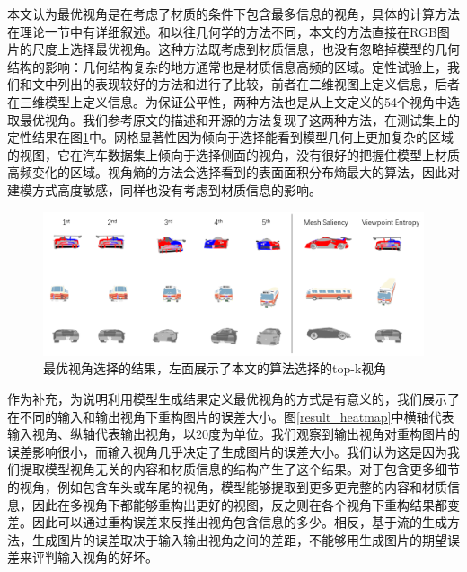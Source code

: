 \documentclass[UTF8,openany,AutoFakeBold,AutoFakeSlant,cs4size]{ctexbook}
\begin{document}
本文认为最优视角是在考虑了材质的条件下包含最多信息的视角，具体的计算方法在理论一节中有详细叙述。和以往几何学的方法不同，本文的方法直接在RGB图片的尺度上选择最优视角。这种方法既考虑到材质信息，也没有忽略掉模型的几何结构的影响：几何结构复杂的地方通常也是材质信息高频的区域。定性试验上，我们和\cite{Dutagaci2010ABF}文中列出的表现较好的方法\cite{Vzquez2003AutomaticVS}和\cite{Lee2005MeshS}进行了比较，前者在二维视图上定义信息，后者在三维模型上定义信息。为保证公平性，两种方法也是从上文定义的54个视角中选取最优视角。我们参考原文的描述和开源的方法复现了这两种方法，在测试集上的定性结果在图\ref{result_bestview}中。网格显著性\cite{Lee2005MeshS}因为倾向于选择能看到模型几何上更加复杂的区域的视图，它在汽车数据集上倾向于选择侧面的视角，没有很好的把握住模型上材质高频变化的区域。视角熵\cite{Vzquez2003AutomaticVS}的方法会选择看到的表面面积分布熵最大的算法，因此对建模方式高度敏感，同样也没有考虑到材质信息的影响。

\begin{figure}
\centering
\includegraphics[width=\linewidth]{./images/best_viewpoint_thesis.png}
\caption{最优视角选择的结果，左面展示了本文的算法选择的top-k视角}
\label{result_bestview}
\end{figure}


作为补充，为说明利用模型生成结果定义最优视角的方式是有意义的，我们展示了在不同的输入和输出视角下重构图片的误差大小。图\ref{result_heatmap}中横轴代表输入视角、纵轴代表输出视角，以20度为单位。我们观察到输出视角对重构图片的误差影响很小，而输入视角几乎决定了生成图片的误差大小。我们认为这是因为我们提取模型视角无关的内容和材质信息的结构产生了这个结果。对于包含更多细节的视角，例如包含车头或车尾的视角，模型能够提取到更多更完整的内容和材质信息，因此在多视角下都能够重构出更好的视图，反之则在各个视角下重构结果都变差。因此可以通过重构误差来反推出视角包含信息的多少。相反，基于流的生成方法，生成图片的误差取决于输入输出视角之间的差距，不能够用生成图片的期望误差来评判输入视角的好坏。
\end{document}
